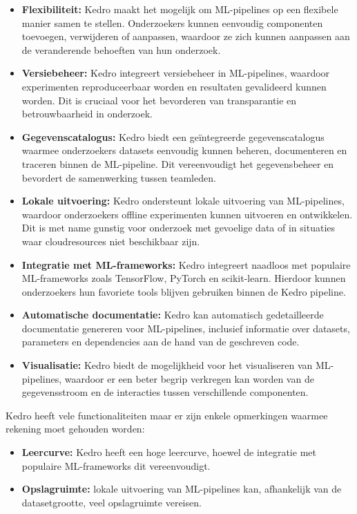 \begin{itemize}
    \item \textbf{Flexibiliteit:} Kedro maakt het mogelijk om ML-pipelines op een flexibele manier samen te stellen. Onderzoekers kunnen eenvoudig componenten toevoegen, verwijderen of aanpassen, waardoor ze zich kunnen aanpassen aan de veranderende behoeften van hun onderzoek.
    \item \textbf{Versiebeheer:} Kedro integreert versiebeheer in ML-pipelines, waardoor experimenten reproduceerbaar worden en resultaten gevalideerd kunnen worden. Dit is cruciaal voor het bevorderen van transparantie en betrouwbaarheid in onderzoek.
    \item \textbf{Gegevenscatalogus:} Kedro biedt een geïntegreerde gegevenscatalogus waarmee onderzoekers datasets eenvoudig kunnen beheren, documenteren en traceren binnen de ML-pipeline. Dit vereenvoudigt het gegevensbeheer en bevordert de samenwerking tussen teamleden.
    \item \textbf{Lokale uitvoering:} Kedro ondersteunt lokale uitvoering van ML-pipelines, waardoor onderzoekers offline experimenten kunnen uitvoeren en ontwikkelen. Dit is met name gunstig voor onderzoek met gevoelige data of in situaties waar cloudresources niet beschikbaar zijn.
    \item \textbf{Integratie met ML-frameworks:} Kedro integreert naadloos met populaire ML-frameworks zoals TensorFlow, PyTorch en scikit-learn. Hierdoor kunnen onderzoekers hun favoriete tools blijven gebruiken binnen de Kedro pipeline.
    \item \textbf{Automatische documentatie:} Kedro kan automatisch gedetailleerde documentatie genereren voor ML-pipelines, inclusief informatie over datasets, parameters en dependencies aan de hand van de geschreven code.
    \item \textbf{Visualisatie:} Kedro biedt de mogelijkheid voor het visualiseren van ML-pipelines, waardoor er een beter begrip verkregen kan worden van de gegevensstroom en de interacties tussen verschillende componenten.
\end{itemize}

Kedro heeft vele functionaliteiten maar er zijn enkele opmerkingen waarmee rekening moet gehouden worden:

\begin{itemize}
    \item \textbf{Leercurve:} Kedro heeft een hoge leercurve, hoewel de integratie met populaire ML-frameworks dit vereenvoudigt.
    \item \textbf{Opslagruimte:} lokale uitvoering van ML-pipelines kan, afhankelijk van de datasetgrootte, veel opslagruimte vereisen.
\end{itemize}

